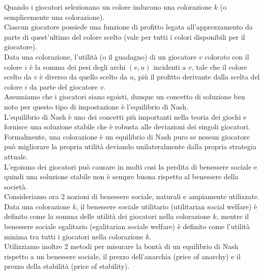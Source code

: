 Quando i giocatori selezionano un colore inducono una colorazione \(k\) (o semplicemente una colorazione).\\

Ciascun giocatore possiede una funzione di profitto legata all'apprezzamento da parte di quest'ultimo del colore scelto (vale per tutti i colori disponibili per il giocatore).\\

Data una colorazione, l'utilità (o il guadagno) di un giocatore \(v\) colorato con il colore \(i\) è la somma dei pesi degli archi \((v, u)\) incidenti a \(v\), tale che il colore scelto da \(v\) è diverso da quello scelto da \(u\), più il profitto derivante dalla scelta del colore \(i\) da parte del giocatore \(v\).\\

Assumiamo che i giocatori siano egoisti, dunque un concetto di soluzione ben noto per questo tipo di impostazione è l'equilibrio di Nash.\\

L'equilibrio di Nash è uno dei concetti più importanti nella teoria dei giochi e fornisce una soluzione stabile che è robusta alle deviazioni dei singoli giocatori.\\

Formalmente, una colorazione è un equilibrio di Nash puro se nessun giocatore può migliorare la propria utilità deviando unilateralmente dalla propria strategia attuale.\\

L'egoismo dei giocatori può causare in molti casi la perdita di benessere sociale e quindi una soluzione stabile non è sempre buona rispetto al benessere della società.\\

Consideriamo ora 2 nozioni di benessere sociale, naturali e ampiamente utilizzate.\\

Data una colorazione \(k\), il benessere sociale utilitario (utilitarian social welfare) è definito come la somma delle utilità dei giocatori nella colorazione \(k\), mentre il benessere sociale egalitario (egalitarian sociale welfare) è definito come l'utilità minima tra tutti i giocatori nella colorazione \(k\).\\

Utilizziamo inoltre 2 metodi per misurare la bontà di un equilibrio di Nash rispetto a un benessere sociale, il prezzo dell'anarchia (price of anarchy) e il prezzo della stabilità (price of stability).\\

